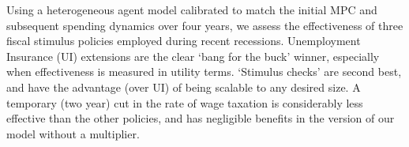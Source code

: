 
Using a heterogeneous agent model calibrated to match the initial MPC and subsequent spending dynamics over four years, we assess the effectiveness of three fiscal stimulus policies employed during recent recessions.  Unemployment Insurance (UI) extensions are the clear `bang for the buck' winner, especially when effectiveness is measured in utility terms.  `Stimulus checks' are second best, and have the advantage (over UI) of being scalable to any desired size.  A temporary (two year) cut in the rate of wage taxation is considerably less effective than the other policies, and has negligible benefits in the version of our model without a multiplier.

